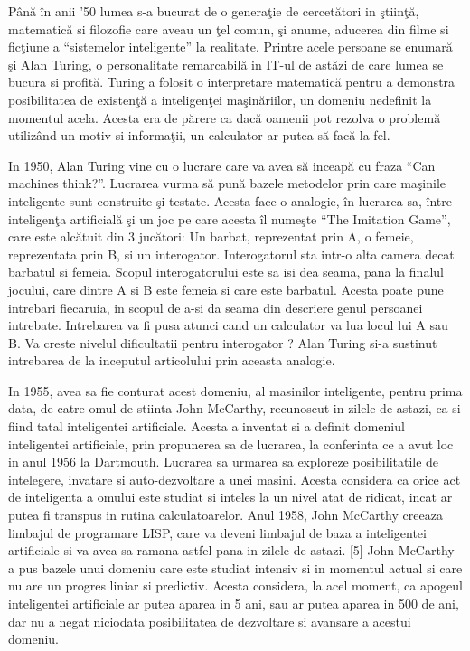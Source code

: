 	Până în anii '50 lumea s-a bucurat de o generaţie de cercetători in ştiinţă, matematică si filozofie care aveau un ţel comun, şi anume, aducerea din filme si ficţiune a “sistemelor inteligente” la realitate. Printre acele persoane se enumară şi Alan Turing, o personalitate remarcabilă in IT-ul de astăzi de care lumea se bucura si profită. Turing a folosit o interpretare matematică pentru a demonstra posibilitatea de existenţă a inteligenţei maşinăriilor, un domeniu nedefinit la momentul acela. Acesta era de părere ca dacă oamenii pot rezolva o problemă utilizând un motiv si informaţii, un calculator ar putea să facă la fel. \cite{ai_history}
	
	In 1950, Alan Turing vine cu o lucrare care va avea să inceapă cu fraza “Can machines think?”. Lucrarea vurma să pună bazele metodelor prin care maşinile inteligente sunt construite şi testate. Acesta face o analogie, în lucrarea sa, între inteligenţa artificială şi un joc pe care acesta îl numeşte “The Imitation Game”, care este alcătuit din 3 jucători: Un barbat, reprezentat prin A, o femeie, reprezentata prin B, si un interogator. Interogatorul sta intr-o alta camera decat barbatul si femeia. Scopul interogatorului este sa isi dea seama, pana la finalul jocului, care dintre A si B este femeia si care este barbatul. Acesta poate pune intrebari fiecaruia, in scopul de a-si da seama din descriere genul persoanei intrebate. Intrebarea va fi pusa atunci cand un calculator va lua locul lui A sau B. Va creste nivelul dificultatii pentru interogator ? Alan Turing si-a sustinut intrebarea de la inceputul  articolului prin aceasta analogie. \cite{turing}
	
	In 1955, avea sa fie conturat acest domeniu, al masinilor inteligente, pentru prima data, de catre omul de stiinta John McCarthy, recunoscut in zilele de astazi, ca si fiind tatal inteligentei artificiale. Acesta a inventat si a definit domeniul inteligentei artificiale, prin propunerea sa de lucrarea, la conferinta ce a avut loc in anul 1956 la Dartmouth. Lucrarea sa urmarea sa exploreze posibilitatile de intelegere, invatare si auto-dezvoltare a unei masini. Acesta considera ca orice act de inteligenta a omului este studiat si  inteles la un nivel atat de ridicat,  incat ar putea fi transpus in rutina calculatoarelor. Anul 1958, John McCarthy creeaza limbajul de programare LISP, care va deveni limbajul de baza a inteligentei artificiale si va avea sa ramana astfel pana in zilele de astazi. [5]
	John McCarthy a pus bazele unui domeniu care este studiat intensiv si in momentul actual si care nu are un progres liniar si predictiv. Acesta considera, la acel moment, ca apogeul inteligentei artificiale ar putea aparea in 5 ani, sau ar putea aparea in 500 de ani, dar nu a negat niciodata posibilitatea de dezvoltare si avansare a acestui domeniu.
	

